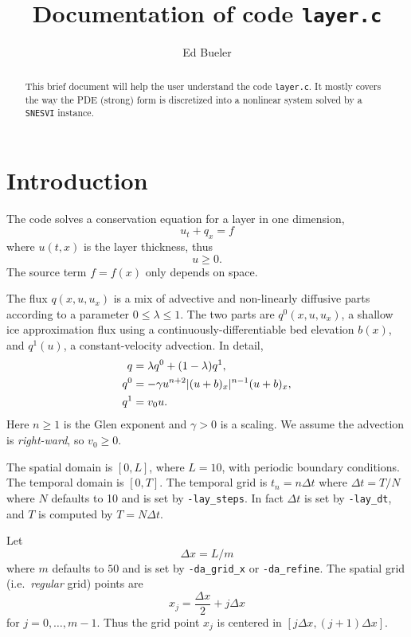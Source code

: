 \documentclass[11pt]{amsart}
\title{Documentation of code \texttt{layer.c}}
\author{Ed Bueler}
\begin{document}
\begin{abstract}
This brief document will help the user understand the code \texttt{layer.c}.  It mostly covers the way the PDE (strong) form is discretized into a nonlinear system solved by a \texttt{SNESVI} instance.
\end{abstract}

\maketitle

\thispagestyle{empty}


\section{Introduction}

The code solves a conservation equation for a layer in one dimension,
\begin{equation}
u_t + q_x = f  \label{eq:conserve}
\end{equation}
where $u(t,x)$ is the layer thickness, thus
\begin{equation}
u \ge 0. \label{eq:constraint}
\end{equation}
The source term $f=f(x)$ only depends on space.

The flux $q(x,u,u_x)$ is a mix of advective and non-linearly diffusive parts according to a parameter $0\le \lambda \le 1$.  The two parts are $q^0(x,u,u_x)$, a shallow ice approximation flux using a continuously-differentiable bed elevation $b(x)$, and $q^1(u)$, a constant-velocity advection.  In detail,
\begin{align}
    q &= \lambda q^0 + (1-\lambda) q^1,  \label{eq:fluxform} \\
  q^0 &= - \gamma u^{n+2} |(u+b)_x|^{n-1} (u+b)_x, \notag \\
  q^1 &= v_0 u. \notag
\end{align}
Here $n\ge 1$ is the Glen exponent and $\gamma>0$ is a scaling.  We assume the advection is \emph{right-ward}, so $v_0 \ge 0$.

The spatial domain is $[0,L]$, where $L=10$, with periodic boundary conditions.  The temporal domain is $[0,T]$.  The temporal grid is $t_n = n\Delta t$ where $\Delta t = T/N$ where $N$ defaults to 10 and is set by \verb|-lay_steps|.  In fact $\Delta t$ is set by \verb|-lay_dt|, and $T$ is computed by $T=N\Delta t$.

Let
  $$\Delta x = L / m$$
where $m$ defaults to $50$ and is set by \verb|-da_grid_x| or \verb|-da_refine|.  The spatial grid (i.e.~\emph{regular} grid) points are
    $$x_j = \frac{\Delta x}{2} + j \Delta x$$
for $j=0,\dots,m-1$.  Thus the grid point $x_j$ is centered in $[j\Delta x,(j+1)\Delta x]$.
\end{document}
